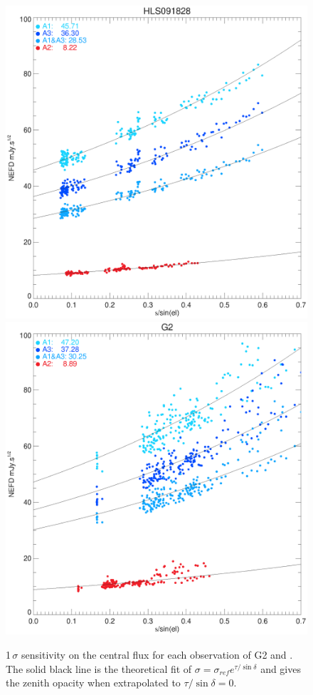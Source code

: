 \begin{figure}[hhh]
\begin{center}
\includegraphics[clip, angle=0, scale =0.42]{Figures/hls_NEFD_vs_TauElev_all.eps}
\includegraphics[clip, angle=0, scale =0.42]{Figures/g2_NEFD_vs_TauElev_all.eps}
\caption[NEFD per scan]{1\,$\sigma$ sensitivity on the central flux for each
  observation of G2 and \hls. The solid black line is the theoretical fit of
  $\sigma = \sigma_{ref}e^{\tau/\sin\delta}$ and gives the zenith opacity when
  extrapolated to $\tau/\sin\delta = 0$.}
\label{fig:nefd_scatter}
\end{center}
\end{figure}



